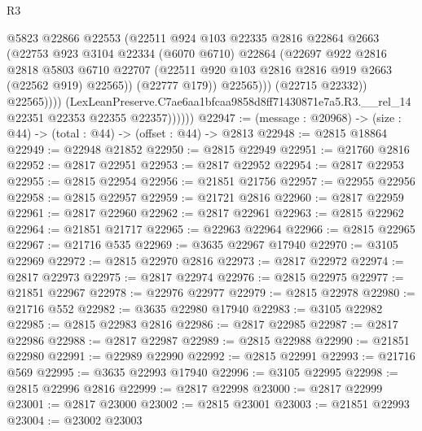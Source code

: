 \begin{lexlean}{R3}
\begin{coremodule}
                            @5823
                            @22866
                            @22553
                            (@22511
                              @924
                              @103
                              @22335
                              @2816
                              @22864
                              @2663
                              (@22753
                                @923
                                @3104
                                @22334
                                (@6070 @6710)
                                @22864
                                (@22697
                                  @922
                                  @2816
                                  @2818
                                  @5803
                                  @6710
                                  @22707
                                  (@22511 @920 @103 @2816 @2816 @919 @2663 (@22562 @919) @22565))
                                (@22777 @179))
                              @22565)))
                        (@22715 @22332))
                      @22565))))
              (LexLeanPreserve.C7ae6aa1bfcaa9858d8ff71430871e7a5.R3.__rel_14
                @22351
                @22353
                @22355
                @22357))))))
@22947 := (message : @20968) -> (size : @44) -> (total : @44) -> (offset : @44) -> @2813
@22948 := @2815 @18864
@22949 := @22948 @21852
@22950 := @2815 @22949
@22951 := @21760 @2816
@22952 := @2817 @22951
@22953 := @2817 @22952
@22954 := @2817 @22953
@22955 := @2815 @22954
@22956 := @21851 @21756
@22957 := @22955 @22956
@22958 := @2815 @22957
@22959 := @21721 @2816
@22960 := @2817 @22959
@22961 := @2817 @22960
@22962 := @2817 @22961
@22963 := @2815 @22962
@22964 := @21851 @21717
@22965 := @22963 @22964
@22966 := @2815 @22965
@22967 := @21716 @535
@22969 := @3635 @22967 @17940
@22970 := @3105 @22969
@22972 := @2815 @22970 @2816
@22973 := @2817 @22972
@22974 := @2817 @22973
@22975 := @2817 @22974
@22976 := @2815 @22975
@22977 := @21851 @22967
@22978 := @22976 @22977
@22979 := @2815 @22978
@22980 := @21716 @552
@22982 := @3635 @22980 @17940
@22983 := @3105 @22982
@22985 := @2815 @22983 @2816
@22986 := @2817 @22985
@22987 := @2817 @22986
@22988 := @2817 @22987
@22989 := @2815 @22988
@22990 := @21851 @22980
@22991 := @22989 @22990
@22992 := @2815 @22991
@22993 := @21716 @569
@22995 := @3635 @22993 @17940
@22996 := @3105 @22995
@22998 := @2815 @22996 @2816
@22999 := @2817 @22998
@23000 := @2817 @22999
@23001 := @2817 @23000
@23002 := @2815 @23001
@23003 := @21851 @22993
@23004 := @23002 @23003

\end{coremodule}
\end{lexlean}
